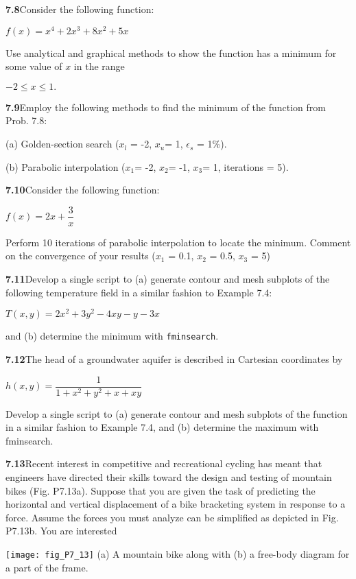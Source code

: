 \documentclass[../main.tex]{subfiles}
\begin{document}
\begin{multicols}{2}
	\noindent\textbf{7.8}Consider the following function:

	\noindent $f(x) = x^4 + 2x^3 + 8x^2 + 5x$

	\noindent Use analytical and graphical methods to show the function
	has a minimum for some value of $x$ in the range

	$-2 \le x \le 1.$

	\noindent\textbf{7.9}Employ the following methods to find the minimum of
	the function from Prob. 7.8:

	\noindent (a) Golden-section search ($x_l$ = -2, $x_u$= 1, $\epsilon_s$ = 1\%).

	\noindent (b) Parabolic interpolation ($x_1$= -2, $x_2$= -1, $x_3$= 1, iterations = 5).

	\noindent\textbf{7.10}Consider the following function:

	\noindent$f(x)=2x+\dfrac{3}{x}$

	\noindent Perform 10 iterations of parabolic interpolation to locate
	the minimum. Comment on the convergence of your results
	($x_1$ = 0.1, $x_2$ = 0.5, $x_3$ = 5)

	\noindent\textbf{7.11}Develop a single script to (a) generate contour and
	mesh subplots of the following temperature field in a similar
	fashion to Example 7.4:

	\noindent $T(x, y) = 2x^2 + 3y^2 - 4xy - y - 3x$

	\noindent and (b) determine the minimum with \texttt{fminsearch}.

	\noindent\textbf{7.12}The head of a groundwater aquifer is described in
	Cartesian coordinates by

	\noindent $h(x,y) = \dfrac{1}{1+x^2 + y^2 + x +xy}$

	\noindent Develop a single script to (a) generate contour and mesh
	subplots of the function in a similar fashion to Example 7.4,
	and (b) determine the maximum with fminsearch.

	\noindent\textbf{7.13}Recent interest in competitive and recreational cycling
	has meant that engineers have directed their skills toward the
	design and testing of mountain bikes (Fig. P7.13a). Suppose
	that you are given the task of predicting the horizontal
	and vertical displacement of a bike bracketing system in
	response to a force. Assume the forces you must analyze can
	be simplified as depicted in Fig. P7.13b. You are interested

	\begin{center}
	\texttt{[image: fig\_P7\_13]}
	\textsf{(a) A mountain bike along with (b) a free-body diagram
	for a part of the frame.}
	\end{center}


\end{multicols}
\end{document}
